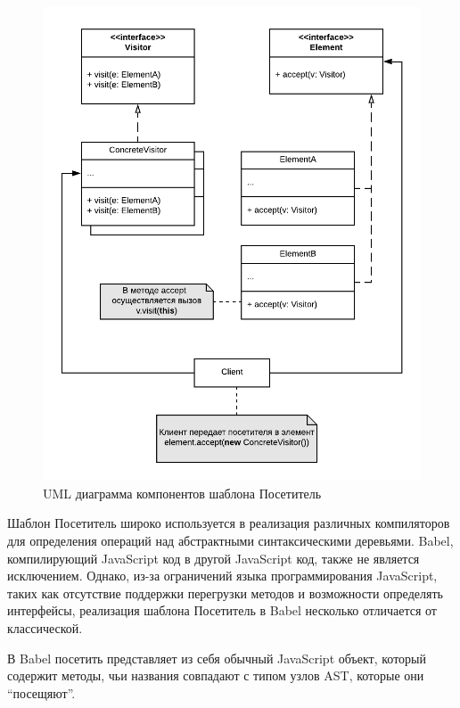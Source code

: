 \documentclass[14pt, a4paper]{article}
\begin{document}
\begin{figure}[h!]
  \centering
  \includegraphics[scale=1.0]{img/visitor_uml.png}
  \caption{UML диаграмма компонентов шаблона Посетитель}
  \label{visitor_uml}
\end{figure}

Шаблон Посетитель широко используется в реализация различных компиляторов для определения операций над 
абстрактными синтаксическими деревьями. Babel, компилирующий JavaScript код в другой JavaScript код,
также не является исключением. Однако, из-за ограничений языка программирования JavaScript, таких как
отсутствие поддержки перегрузки методов и возможности определять интерфейсы, реализация шаблона Посетитель
в Babel несколько отличается от классической.

В Babel посетить представляет из себя обычный JavaScript объект, который содержит методы, чьи названия 
совпадают с типом узлов AST, которые они ``посещяют''.


\end{document}
